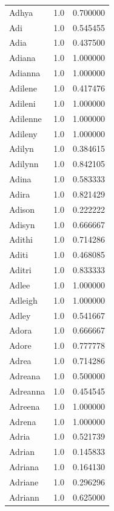 \documentclass[
  letterpaper,
  DIV=11,
  numbers=noendperiod]{scrreprt}
\begin{document}
\begin{tabular}{lrr}
Adhya           &   1.0 &   0.700000 \\
Adi             &   1.0 &   0.545455 \\
Adia            &   1.0 &   0.437500 \\
Adiana          &   1.0 &   1.000000 \\
Adianna         &   1.0 &   1.000000 \\
Adilene         &   1.0 &   0.417476 \\
Adileni         &   1.0 &   1.000000 \\
Adilenne        &   1.0 &   1.000000 \\
Adileny         &   1.0 &   1.000000 \\
Adilyn          &   1.0 &   0.384615 \\
Adilynn         &   1.0 &   0.842105 \\
Adina           &   1.0 &   0.583333 \\
Adira           &   1.0 &   0.821429 \\
Adison          &   1.0 &   0.222222 \\
Adisyn          &   1.0 &   0.666667 \\
Adithi          &   1.0 &   0.714286 \\
Aditi           &   1.0 &   0.468085 \\
Aditri          &   1.0 &   0.833333 \\
Adlee           &   1.0 &   1.000000 \\
Adleigh         &   1.0 &   1.000000 \\
Adley           &   1.0 &   0.541667 \\
Adora           &   1.0 &   0.666667 \\
Adore           &   1.0 &   0.777778 \\
Adrea           &   1.0 &   0.714286 \\
Adreana         &   1.0 &   0.500000 \\
Adreanna        &   1.0 &   0.454545 \\
Adreena         &   1.0 &   1.000000 \\
Adrena          &   1.0 &   1.000000 \\
Adria           &   1.0 &   0.521739 \\
Adrian          &   1.0 &   0.145833 \\
Adriana         &   1.0 &   0.164130 \\
Adriane         &   1.0 &   0.296296 \\
Adriann         &   1.0 &   0.625000 \\

\end{tabular}
\end{document}
